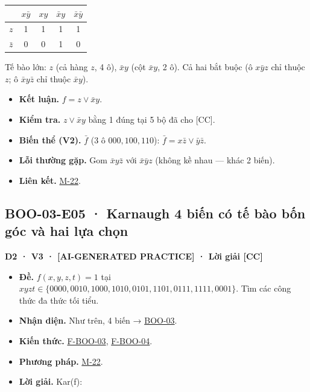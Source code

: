 \documentclass[
  10pt,
  twoside,openany]{book}
\providecommand{\tightlist}{%
  \setlength{\itemsep}{0pt}\setlength{\parskip}{0pt}}
\begin{document}
\begin{longtable}[]{@{}lcccc@{}}
\toprule\noalign{}
& \(x\bar y\) & \(xy\) & \(\bar xy\) & \(\bar x\bar y\) \\
\midrule\noalign{}
\endhead
\bottomrule\noalign{}
\endlastfoot
\(z\) & 1 & 1 & 1 & 1 \\
\(\bar z\) & 0 & 0 & 1 & 0 \\
\end{longtable}

Tế bào lớn: \(z\) (cả hàng \(z\), 4 ô), \(\bar xy\) (cột \(\bar xy\), 2
ô). Cả hai bắt buộc (ô \(x\bar yz\) chỉ thuộc \(z\); ô \(\bar xy\bar z\)
chỉ thuộc \(\bar xy\)).

\begin{itemize}
\tightlist
\item
  \textbf{Kết luận.} \(f=z\vee\bar xy\).
\item
  \textbf{Kiểm tra.} \(z\vee\bar xy\) bằng 1 đúng tại 5 bộ đã cho
  {[}CC{]}.
\item
  \textbf{Biến thể (V2).} \(\bar f\) (3 ô \(000,100,110\)):
  \(\bar f=x\bar z\vee\bar y\bar z\).
\item
  \textbf{Lỗi thường gặp.} Gom \(\bar xy\bar z\) với \(\bar x\bar yz\)
  (không kề nhau --- khác 2 biến).
\item
  \textbf{Liên kết.} \protect\hyperlink{M-22}{M-22}.
\end{itemize}

\hypertarget{BOO-03-E05}{%
\subsection{BOO-03-E05 · Karnaugh 4 biến có tế bào bốn góc và hai lựa
chọn}\label{BOO-03-E05}}

\textbf{D2 · V3 · {[}AI-GENERATED PRACTICE{]} · Lời giải {[}CC{]}}

\begin{itemize}
\tightlist
\item
  \textbf{Đề.} \(f(x,y,z,t)=1\) tại
  \(xyzt\in\{0000,0010,1000,1010,0101,1101,0111,1111,0001\}\). Tìm các
  công thức đa thức tối tiểu.
\item
  \textbf{Nhận diện.} Như trên, 4 biến →
  \protect\hyperlink{BOO-03}{BOO-03}.
\item
  \textbf{Kiến thức.} \protect\hyperlink{F-BOO-03}{F-BOO-03},
  \protect\hyperlink{F-BOO-04}{F-BOO-04}.
\item
  \textbf{Phương pháp.} \protect\hyperlink{M-22}{M-22}.
\item
  \textbf{Lời giải.} Kar(f):
\end{itemize}
\end{document}
